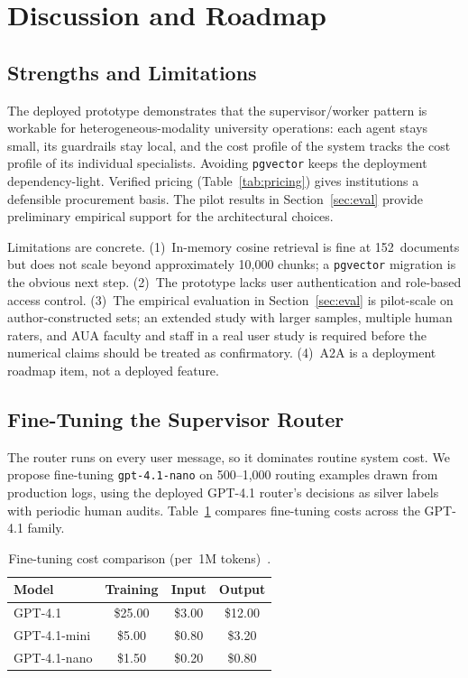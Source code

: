 \documentclass[conference]{IEEEtran}
\begin{document}
\section{Discussion and Roadmap}

\subsection{Strengths and Limitations}
\label{sec:limits}

The deployed prototype demonstrates that the supervisor/worker pattern is workable for heterogeneous-modality university operations: each agent stays small, its guardrails stay local, and the cost profile of the system tracks the cost profile of its individual specialists. Avoiding \texttt{pgvector} keeps the deployment dependency-light. Verified pricing (Table~\ref{tab:pricing}) gives institutions a defensible procurement basis. The pilot results in Section~\ref{sec:eval} provide preliminary empirical support for the architectural choices.

Limitations are concrete. (1)~In-memory cosine retrieval is fine at 152~documents but does not scale beyond approximately 10{,}000 chunks; a \texttt{pgvector} migration is the obvious next step. (2)~The prototype lacks user authentication and role-based access control. (3)~The empirical evaluation in Section~\ref{sec:eval} is pilot-scale on author-constructed sets; an extended study with larger samples, multiple human raters, and AUA faculty and staff in a real user study is required before the numerical claims should be treated as confirmatory. (4)~A2A is a deployment roadmap item, not a deployed feature.

\subsection{Fine-Tuning the Supervisor Router}

The router runs on every user message, so it dominates routine system cost. We propose fine-tuning \texttt{gpt-4.1-nano} on 500--1{,}000 routing examples drawn from production logs, using the deployed GPT-4.1 router's decisions as silver labels with periodic human audits. Table~\ref{tab:finetune} compares fine-tuning costs across the GPT-4.1 family.

\begin{table}[h]
\centering
\caption{Fine-tuning cost comparison (per~1M tokens)~\cite{openai_pricing_2026,openai_ft_2025}.}
\label{tab:finetune}
\begin{tabular}{lccc}
\toprule
Model & Training & Input & Output \\
\midrule
GPT-4.1       & \$25.00 & \$3.00 & \$12.00 \\
GPT-4.1-mini  & \$5.00  & \$0.80 & \$3.20  \\
GPT-4.1-nano  & \$1.50  & \$0.20 & \$0.80  \\
\bottomrule
\end{tabular}
\end{table}
\end{document}
